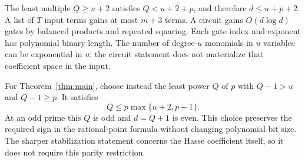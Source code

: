 The least multiple $Q\ge u+2$ satisfies $Q<u+2+p$, and therefore $d\le u+p+2$. A list of $T$ input terms gains at most $m+3$ terms. A circuit gains $O(d\log d)$ gates by balanced products and repeated squaring. Each gate index and exponent has polynomial binary length. The number of degree-$u$ monomials in $u$ variables can be exponential in $u$; the circuit statement does not materialize that coefficient space in the input.

For Theorem~\ref{thm:main}, choose instead the least power $Q$ of $p$ with $Q-1>u$ and $Q-1\ge p$. It satisfies
\[
Q\le p\max\{u+2,p+1\}.
\]
At an odd prime this $Q$ is odd and $d=Q+1$ is even. This choice preserves the required sign in the rational-point formula without changing polynomial bit size. The sharper stabilization statement concerns the Hasse coefficient itself, so it does not require this parity restriction.

